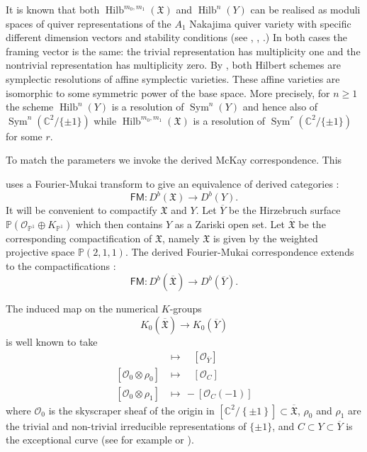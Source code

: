 \documentclass{amsart}
\theoremstyle{definition}
\newcommand{\CC} {{\mathbb C}}          %
\newcommand{\PP}{\mathbb{P}}
\newcommand{\X}{\mathfrak{X}}
\newcommand{\Xbar}{\overline{\mathfrak{X}}}
\newcommand{\Ybar}{\overline{Y}}
\newcommand{\FM}{\mathsf{FM}}
\renewcommand{\O}{\mathcal{O}}
\newcommand{\Sym}{\operatorname{Sym}}
\newcommand{\Hilb}{\operatorname{Hilb}}
\newcommand{\adam}{\color{blue}}
\begin{document}
{\adam It is known that both $\Hilb^{m_{0},m_{1}}(\X )$ and $\Hilb^{n}(Y)$ can be realised as moduli spaces of quiver
	representations of the $A_{1}$ Nakajima quiver variety with specific different dimension vectors and stability conditions (see \cite[Corollary 1.3]{bellamy2020birational}, \cite[Proposition 5.2]{craw2021quot}, \cite[page 2]{Kuznetsov}.)
 In both cases the framing vector is the same: the trivial representation has multiplicity one and the nontrivial representation has multiplicity zero.
 By \cite[Sections~2 and 3]{nakajima2002geometric}, both Hilbert schemes are symplectic resolutions of affine symplectic varieties. These affine varieties are isomorphic to some symmetric power of the base space. More precisely, for $n \geq 1$ the scheme $\Hilb^{n}(Y)$  is a resolution of $\Sym^{n} (Y)$ and hence also of $\Sym^{n} (\CC^{2}/\{\pm 1\})$ while $\Hilb^{m_{0},m_{1}}(\X )$ is a resolution of $\Sym^{r} (\CC^{2}/\{\pm 1\})$ for some $r$. 
 
 To match the parameters we invoke the derived McKay correspondence. This
}
uses a Fourier-Mukai transform to
give an equivalence of derived categories \cite{BKR, Kapranov-Vasserot}:
\[
\FM :D^{b}(\X )\to D^{b}(Y).
\]
It will be convenient to compactify $\X$ and
$Y$. Let $\Ybar$ be the Hirzebruch surface $\PP (\O_{\PP^{1}}\oplus
K_{\PP^{1}})$ which then contains $Y$ as a Zariski open set. Let
$\Xbar$ be the corresponding compactification of $\X$, namely $\X$ is
given by the weighted projective space $\PP (2,1,1)$. The derived
Fourier-Mukai correspondence extends to the compactifications \cite{Chen-Tseng-BKRnon-global}:
\[
\FM : D^{b}(\Xbar )\to D^{b}(\Ybar ).
\]

The induced map on the numerical $K$-groups
\[
K_{0}(\Xbar ) \to K_{0}(\Ybar )
\]
is well known to take
\begin{align*}
[\O_{\Xbar}]& \longmapsto \quad [\O_{\Ybar }] \\
[\O_{0}\otimes \rho_{0}] &\longmapsto  \quad [\O_{C}]\\
[\O_{0}\otimes \rho_{1}] &\longmapsto \, -[\O_{C}(-1)]
\end{align*}
where $\O_{0}$ is the skyscraper sheaf of the origin in
$[\CC^{2}/\left\{\pm 1 \right\}]\subset \Xbar $,
$\rho_{0}$ and $\rho_{1}$ are the trivial and non-trivial irreducible
representations of $\{\pm 1 \}$, and $C\subset Y\subset \Ybar $ is the exceptional
curve (see for example \cite{Gonzalez-Sprinberg-Verdier} or \cite{Kapranov-Vasserot}).
\end{document}
